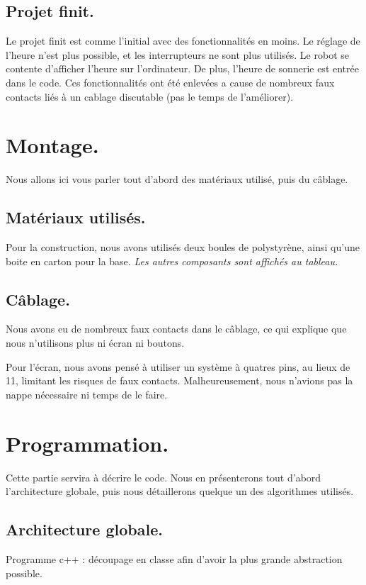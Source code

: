 \documentclass{article}
\begin{document}
\subsection{Projet finit.}
Le projet finit est comme l'initial avec des fonctionnalités en moins. Le réglage de l'heure n'est plus possible, et les interrupteurs ne sont plus utilisés. Le robot se contente d'afficher l'heure sur l'ordinateur. De plus, l'heure de sonnerie est entrée dans le code. Ces fonctionnalités ont été enlevées a cause de nombreux faux contacts liés à un cablage discutable (pas le temps de l'améliorer).

\section{Montage.}
Nous allons ici vous parler tout d'abord des matériaux utilisé, puis du câblage.

\subsection{Matériaux utilisés.}
Pour la construction, nous avons utilisés deux boules de polystyrène, ainsi qu'une boite en carton pour la base. \emph{Les autres composants sont affichés au tableau.}

\subsection{Câblage.}
Nous avons eu de nombreux faux contacts dans le câblage, ce qui explique que nous n'utilisons plus ni écran ni boutons.

Pour l'écran, nous avons pensé à utiliser un système à quatres pins, au lieux de 11, limitant les risques de faux contacts. Malheureusement, nous n'avions pas la nappe nécessaire ni temps de le faire.

\section{Programmation.}
Cette partie servira à décrire le code. Nous en présenterons tout d'abord l'architecture globale, puis nous détaillerons quelque un des algorithmes utilisés.

\subsection{Architecture globale.}
Programme c++ : découpage en classe afin d'avoir la plus grande abstraction possible.
\end{document}
